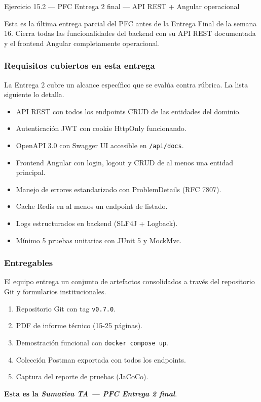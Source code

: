 \documentclass[11pt,a4paper,openany]{book}
\begin{document}
\begin{cajaejercicio}{Ejercicio 15.2 --- PFC Entrega 2 final --- API REST + Angular operacional}

Esta es la última entrega parcial del PFC antes de la Entrega Final
de la semana 16. Cierra todas las funcionalidades del backend con su
API REST documentada y el frontend Angular completamente operacional.

\subsubsection*{Requisitos cubiertos en esta entrega}

La Entrega 2 cubre un alcance específico que se evalúa
contra rúbrica. La lista siguiente lo detalla.


\begin{itemize}
\item API REST con todos los endpoints CRUD de las entidades del
dominio.
\item Autenticación JWT con cookie HttpOnly funcionando.
\item OpenAPI 3.0 con Swagger UI accesible en \texttt{/api/docs}.
\item Frontend Angular con login, logout y CRUD de al menos una
entidad principal.
\item Manejo de errores estandarizado con ProblemDetails (RFC 7807).
\item Cache Redis en al menos un endpoint de listado.
\item Logs estructurados en backend (SLF4J + Logback).
\item Mínimo 5 pruebas unitarias con JUnit 5 y MockMvc.
\end{itemize}

\subsubsection*{Entregables}

El equipo entrega un conjunto de artefactos consolidados a
través del repositorio Git y formularios institucionales.


\begin{enumerate}
\item Repositorio Git con tag \texttt{v0.7.0}.
\item PDF de informe técnico (15-25 páginas).
\item Demostración funcional con \texttt{docker compose up}.
\item Colección Postman exportada con todos los endpoints.
\item Captura del reporte de pruebas (JaCoCo).
\end{enumerate}

\textbf{Esta es la \emph{Sumativa TA --- PFC Entrega 2 final}}.
\end{cajaejercicio}
\end{document}
